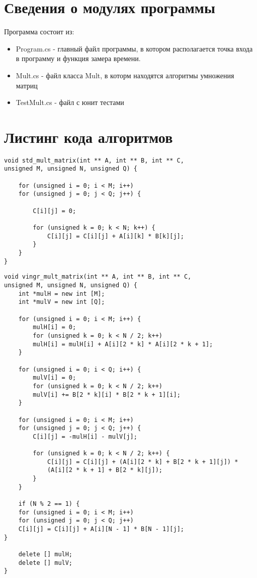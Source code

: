 \documentclass[12pt]{report}
\begin{document}
\section{Сведения о модулях программы}
Программа состоит из:
\begin{itemize}
	\item Program.cs - главный файл программы, в котором располагается точка входа в программу и функция замера времени.
	\item Mult.cs - файл класса Mult, в которм находятся алгоритмы умножения матриц
	\item TestMult.cs - файл с юнит тестами
\end{itemize}


\section{Листинг кода алгоритмов}

\begin{lstlisting}[label=CodeStand,caption= Стандартный алгоритм умножения матриц]
void std_mult_matrix(int ** A, int ** B, int ** C,
unsigned M, unsigned N, unsigned Q) {
	
	for (unsigned i = 0; i < M; i++)
	for (unsigned j = 0; j < Q; j++) {
		
		C[i][j] = 0;
		
		for (unsigned k = 0; k < N; k++) {
			C[i][j] = C[i][j] + A[i][k] * B[k][j];
		} 
	}
}
\end{lstlisting}


\begin{lstlisting}[label=some-code,caption=Алгоритм Винограда]
void vingr_mult_matrix(int ** A, int ** B, int ** C,
unsigned M, unsigned N, unsigned Q) {
	int *mulH = new int [M];
	int *mulV = new int [Q];
	
	for (unsigned i = 0; i < M; i++) {
		mulH[i] = 0;
		for (unsigned k = 0; k < N / 2; k++)
		mulH[i] = mulH[i] + A[i][2 * k] * A[i][2 * k + 1];
	}
	
	for (unsigned i = 0; i < Q; i++) {
		mulV[i] = 0;
		for (unsigned k = 0; k < N / 2; k++)
		mulV[i] += B[2 * k][i] * B[2 * k + 1][i];
	}
	
	for (unsigned i = 0; i < M; i++)
	for (unsigned j = 0; j < Q; j++) {
		C[i][j] = -mulH[i] - mulV[j];
		
		for (unsigned k = 0; k < N / 2; k++) {
			C[i][j] = C[i][j] + (A[i][2 * k] + B[2 * k + 1][j]) *
			(A[i][2 * k + 1] + B[2 * k][j]);
		}
	}
	
	if (N % 2 == 1) {
	for (unsigned i = 0; i < M; i++)
	for (unsigned j = 0; j < Q; j++)
	C[i][j] = C[i][j] + A[i][N - 1] * B[N - 1][j];
}

	delete [] mulH;
	delete [] mulV;
}
\end{lstlisting}
\end{document}
